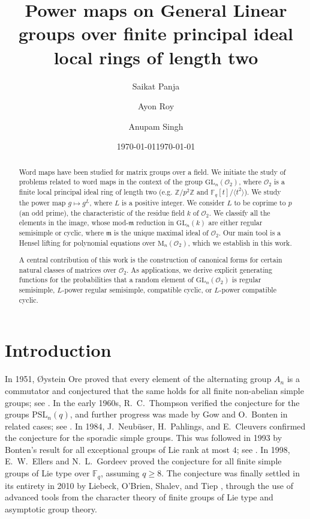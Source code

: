\documentclass[11pt,twoside]{amsart}
\title[Power maps on $\mathrm{GL}_n(\mathscr O_2)$]{Power maps on  General Linear groups over finite principal ideal local rings of length two}
\date{\today}
\author[Panja]{Saikat Panja\orcidlink{0000-0002-9639-3122}}
\author[Roy]{Ayon Roy}
\author[Singh]{Anupam Singh}
\date{\today}
\theoremstyle{definition} %
\begin{document}
\begin{abstract}
Word maps have been studied for matrix groups over a field. We initiate the study of problems related to word maps in the context of the group $\mathrm{GL}_n(\mathscr O_2)$, where $\mathscr O_2$ is a finite local principal ideal ring of length two (e.g.  $\mathbb{Z}/p^2\mathbb{Z}$ and $\mathbb F_q[t]/\langle t^2\rangle$). We study the power map $g\mapsto g^L$, where $L$ is a positive integer. We consider $L$ to be coprime to $p$ (an odd prime), the characteristic of the residue field $k$ of $\mathscr O_2$. We classify all the elements in the image, whose mod-$\mathfrak m$ reduction in $\mathrm{GL}_n(k)$ are either regular semisimple or cyclic, where $\mathfrak m$ is the unique maximal ideal of $\mathscr O_2$. 
Our main tool is a Hensel lifting for polynomial equations over $\mathrm{M}_n(\mathscr O_2)$, which we establish in this work. 

A central contribution of this work is the construction of canonical forms for certain natural classes of matrices over $\mathscr O_2$. As applications, we derive explicit generating functions for the probabilities that a random element of $\mathrm{GL}_n(\mathscr O_2)$ is regular semisimple, $L$-power regular semisimple, compatible cyclic, or $L$-power compatible cyclic.
\end{abstract}
\maketitle
\tableofcontents

\section{Introduction}\label{sec:intro}
In 1951, {\O}ystein Ore proved that every element of the alternating group $A_n$ is a commutator and conjectured that the same holds for all finite non-abelian simple groups; see \cite{Ore1951}. In the early 1960s, R.~C.~Thompson verified the conjecture for the groups $\mathrm{PSL}_n(q)$, and further progress was made by Gow and O.~Bonten in related cases; see \cite{Thompson1961, Thompson1962}. In 1984, J.~Neubüser, H.~Pahlings, and E.~Cleuvers confirmed the conjecture for the sporadic simple groups. This was followed in 1993 by Bonten’s result for all exceptional groups of Lie rank at most $4$; see \cite{Bonten1993}. In 1998, E.~W.~Ellers and N.~L.~Gordeev proved the conjecture for all finite simple groups of Lie type over $\mathbb{F}_q$, assuming $q \geq 8$. The conjecture was finally settled in its entirety in 2010 by Liebeck, O'Brien, Shalev, and Tiep \cite{LiebeckBrienShalev10}, through the use of advanced tools from the character theory of finite groups of Lie type and asymptotic group theory.
\end{document}
